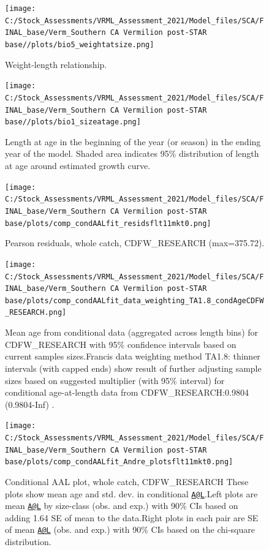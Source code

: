 \documentclass[
  english,
  a4paper,
]{article}
\begin{document}
\FloatBarrier

\begin{figure}
\centering
\texttt{[image: C:/Stock\_Assessments/VRML\_Assessment\_2021/Model\_files/SCA/FINAL\_base/Verm\_Southern CA Vermilion post-STAR base//plots/bio5\_weightatsize.png]}
\caption{Weight-length relationship.\label{fig:weightlength}}
\end{figure}

\begin{figure}
\centering
\texttt{[image: C:/Stock\_Assessments/VRML\_Assessment\_2021/Model\_files/SCA/FINAL\_base/Verm\_Southern CA Vermilion post-STAR base//plots/bio1\_sizeatage.png]}
\caption{Length at age in the beginning of the year (or season) in the ending year of the model. Shaded area indicates 95\% distribution of length at age around estimated growth curve.\label{fig:fittedgrowth}}
\end{figure}

\FloatBarrier

\FloatBarrier

\begin{figure}
\centering
\texttt{[image: C:/Stock\_Assessments/VRML\_Assessment\_2021/Model\_files/SCA/FINAL\_base/Verm\_Southern CA Vermilion post-STAR base/plots/comp\_condAALfit\_residsflt11mkt0.png]}
\caption{Pearson residuals, whole catch, CDFW\_RESEARCH (max=375.72).\label{fig:comp_condAALfit_residsflt11mkt0}}
\end{figure}

\begin{figure}
\centering
\texttt{[image: C:/Stock\_Assessments/VRML\_Assessment\_2021/Model\_files/SCA/FINAL\_base/Verm\_Southern CA Vermilion post-STAR base/plots/comp\_condAALfit\_data\_weighting\_TA1.8\_condAgeCDFW\_RESEARCH.png]}
\caption{Mean age from conditional data (aggregated across length bins) for CDFW\_RESEARCH with 95\% confidence intervals based on current samples sizes.Francis data weighting method TA1.8: thinner intervals (with capped ends) show result of further adjusting sample sizes based on suggested multiplier (with 95\% interval) for conditional age-at-length data from CDFW\_RESEARCH:0.9804 (0.9804-Inf) .\label{fig:comp_condAALfit_data_weighting_TA1.8_condAgeCDFW_RESEARCH}}
\end{figure}

\begin{figure}
\centering
\texttt{[image: C:/Stock\_Assessments/VRML\_Assessment\_2021/Model\_files/SCA/FINAL\_base/Verm\_Southern CA Vermilion post-STAR base/plots/comp\_condAALfit\_Andre\_plotsflt11mkt0.png]}
\caption{Conditional AAL plot, whole catch, CDFW\_RESEARCH
These plots show mean age and std. dev. in conditional \href{mailto:A@L}{\nolinkurl{A@L}}.Left plots are mean \href{mailto:A@L}{\nolinkurl{A@L}} by size-class (obs. and exp.) with 90\% CIs based on adding 1.64 SE of mean to the data.Right plots in each pair are SE of mean \href{mailto:A@L}{\nolinkurl{A@L}} (obs. and exp.) with 90\% CIs based on the chi-square distribution.\label{fig:comp_condAALfit_Andre_plotsflt11mkt0}}
\end{figure}
\end{document}
